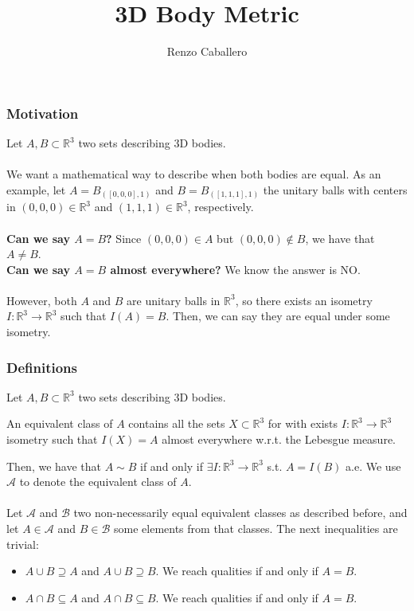 \documentclass[aspectratio=169]{beamer}\usepackage[utf8]{inputenc}
\title{3D Body Metric}
\subtitle{Renzo Caballero}
\newcommand{\R}{\mathbb{R}}
\begin{document}
\begin{frame}
\titlepage
\end{frame}


\begin{frame}\frametitle{Motivation}

Let $A,B\subset\R^3$ two sets describing 3D bodies.\\
\quad\\
We want a mathematical way to describe when both bodies are equal. As an example, let $A=B_{([0,0,0],1)}$ and $B=B_{([1,1,1],1)}$ the unitary balls with centers in $(0,0,0)\in\R^3$ and $(1,1,1)\in\R^3$, respectively.\\
\quad\\
\textbf{Can we say $A=B$?} Since $(0,0,0)\in A$ but $(0,0,0)\notin B$, we have that $A\neq B$.\\
\textbf{Can we say $A=B$ almost everywhere?} We know the answer is NO.\\
\quad\\
However, both $A$ and $B$ are unitary balls in $\R^3$, so there exists an isometry $I:\R^3\to\R^3$ such that $I(A)=B$. Then, we can say they are equal under some isometry.


\end{frame}


\begin{frame}\frametitle{Definitions}

Let $A,B\subset\R^3$ two sets describing 3D bodies.
\begin{definition}
An equivalent class of $A$ contains all the sets $X\subset\R^3$ for with exists $I:\R^3\to\R^3$ isometry such that $I(X)=A$ almost everywhere w.r.t. the Lebesgue measure.
\end{definition}
Then, we have that $A\sim B$ if and only if $\exists I:\R^3\to\R^3$ s.t. $A=I(B)$ a.e. We use $\mathcal{A}$ to denote the equivalent class of $A$.\\
\quad\\
Let $\mathcal{A}$ and $\mathcal{B}$ two non-necessarily equal equivalent classes as described before, and let $A\in\mathcal{A}$ and $B\in\mathcal{B}$ some elements from that classes. The next inequalities are trivial:
\begin{itemize}
\item $A\cup B\supseteq A$ and $A\cup B\supseteq B$. We reach qualities if and only if $A=B$.
\item $A\cap B\subseteq A$ and $A\cap B\subseteq B$. We reach qualities if and only if $A=B$.
\end{itemize}

\end{frame}
\end{document}
